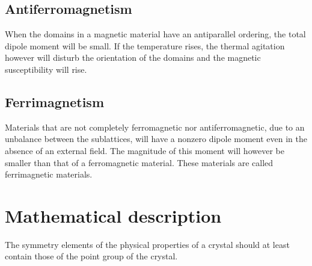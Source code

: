 \subsection{Antiferromagnetism}
	When the domains in a magnetic material have an antiparallel ordering\footnotemark, the total dipole moment will be small. If the temperature rises, the thermal agitation however will disturb the orientation of the domains and the magnetic susceptibility will rise.
    
    
\subsection{Ferrimagnetism}
	Materials that are not completely ferromagnetic nor antiferromagnetic, due to an unbalance between the sublattices, will have a nonzero dipole moment even in the absence of an external field. The magnitude of this moment will however be smaller than that of a ferromagnetic material. These materials are called ferrimagnetic materials.
    

\section{Mathematical description}
	\begin{theorem}
		The symmetry elements of the physical properties of a crystal should at least contain those of the point group of the crystal.
	\end{theorem}

